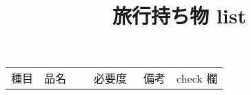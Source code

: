 \documentclass[12pt,a4paper]{article}
\title{旅行持ち物 list}
\begin{document}
\maketitle

\begin{center}
\begin{table}[htb]
	\begin{tabular}{| c | l | c | l | c |} \hline
		種目 & 品名 &　必要度　& 備考 & check 欄	
	\end{tabular}
\end{table}
\end{center}
\end{document}
